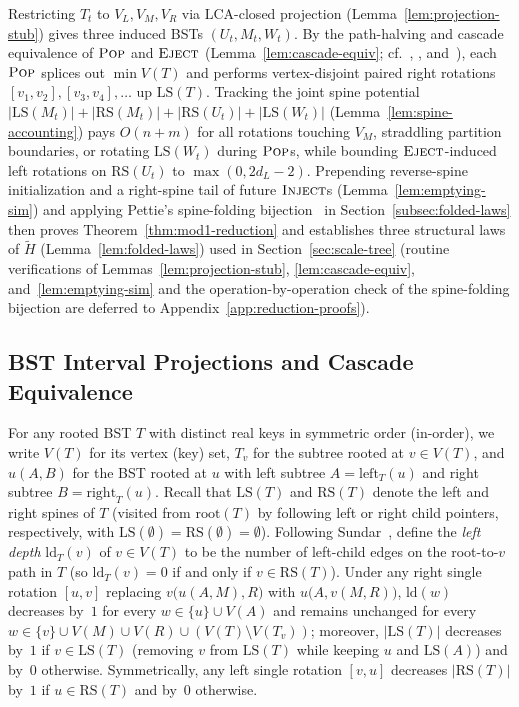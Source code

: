 \documentclass[11pt]{article}
\theoremstyle{definition}
\theoremstyle{remark}
\newcommand{\LS}{\mathrm{LS}}
\newcommand{\RS}{\mathrm{RS}}
\newcommand{\LCA}{\mathrm{LCA}}
\newcommand{\ld}{\mathrm{ld}}
\newcommand{\POP}{\textnormal{\scshape Pop}}
\newcommand{\INJECT}{\textnormal{\scshape Inject}}
\newcommand{\EJECT}{\textnormal{\scshape Eject}}
\begin{document}
Restricting $T_t$ to $V_L, V_M, V_R$ via $\LCA$-closed projection (Lemma~\ref{lem:projection-stub}) gives three induced BSTs $(U_t, M_t, W_t)$. By the path-halving and cascade equivalence of $\POP$ and $\EJECT$ (Lemma~\ref{lem:cascade-equiv}; cf.~\cite{TarjanVanLeeuwen1984,Lucas1990,Lucas1992}, \cite[Section~3, Lemma~10]{Sundar1992}, and~\cite[Section~2, Observation~2.1]{Pettie2008}), each $\POP$ splices out $\min V(T)$ and performs vertex-disjoint paired right rotations $[v_1, v_2], [v_3, v_4], \dots$ up $\LS(T)$. Tracking the joint spine potential $|\LS(M_t)| + |\RS(M_t)| + |\RS(U_t)| + |\LS(W_t)|$ (Lemma~\ref{lem:spine-accounting}) pays $O(n + m)$ for all rotations touching $V_M$, straddling partition boundaries, or rotating $\LS(W_t)$ during $\POP$s, while bounding $\EJECT$-induced left rotations on $\RS(U_t)$ to $\max(0, 2d_L - 2)$. Prepending reverse-spine initialization and a right-spine tail of future $\INJECT$s (Lemma~\ref{lem:emptying-sim}) and applying Pettie's spine-folding bijection~\cite[Section~2, Observation~2.1 and Figure~2]{Pettie2008} in Section~\ref{subsec:folded-laws} then proves Theorem~\ref{thm:mod1-reduction} and establishes three structural laws of $\widetilde{H}$ (Lemma~\ref{lem:folded-laws}) used in Section~\ref{sec:scale-tree} (routine verifications of Lemmas~\ref{lem:projection-stub}, \ref{lem:cascade-equiv}, and~\ref{lem:emptying-sim} and the operation-by-operation check of the spine-folding bijection are deferred to Appendix~\ref{app:reduction-proofs}).

\subsection{BST Interval Projections and Cascade Equivalence}
\label{subsec:projections}

For any rooted BST $T$ with distinct real keys in symmetric order (in-order), we write $V(T)$ for its vertex (key) set, $T_v$ for the subtree rooted at $v \in V(T)$, and $u(A, B)$ for the BST rooted at $u$ with left subtree $A = \mathrm{left}_T(u)$ and right subtree $B = \mathrm{right}_T(u)$. Recall that $\LS(T)$ and $\RS(T)$ denote the left and right spines of $T$ (visited from $\mathrm{root}(T)$ by following left or right child pointers, respectively, with $\LS(\emptyset) = \RS(\emptyset) = \emptyset$). Following Sundar~\cite[Section~1.2]{Sundar1992}, define the \emph{left depth} $\ld_T(v)$ of $v \in V(T)$ to be the number of left-child edges on the root-to-$v$ path in $T$ (so $\ld_T(v) = 0$ if and only if $v \in \RS(T)$). Under any right single rotation $[u, v]$ replacing $v\big(u(A, M), R\big)$ with $u\big(A, v(M, R)\big)$, $\ld(w)$ decreases by~$1$ for every $w \in \{u\} \cup V(A)$ and remains unchanged for every $w \in \{v\} \cup V(M) \cup V(R) \cup (V(T) \setminus V(T_v))$; moreover, $|\LS(T)|$ decreases by~$1$ if $v \in \LS(T)$ (removing $v$ from $\LS(T)$ while keeping $u$ and $\LS(A)$) and by~$0$ otherwise. Symmetrically, any left single rotation $[v, u]$ decreases $|\RS(T)|$ by~$1$ if $u \in \RS(T)$ and by~$0$ otherwise.
\end{document}
